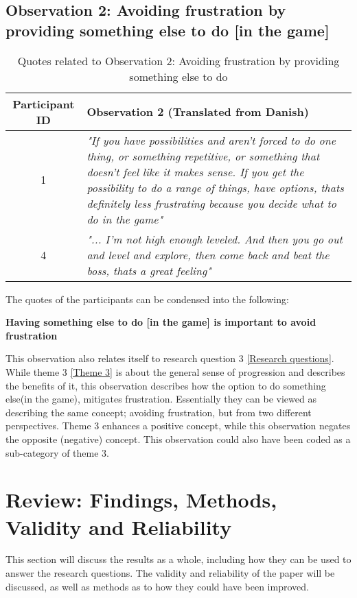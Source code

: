 \subsection{Observation 2: Avoiding frustration by providing something else to do [in the game]}\label{Observation 2}
\begin{table}[H]

\centering
\begin{tabular}{@{}c p{11cm}@{}}
\toprule
\textbf{Participant ID} & \textbf{Observation 2} (Translated from Danish)\\
\midrule

1 & \textit{"If you have possibilities and aren't forced to do one thing, or something repetitive, or something that doesn't feel like it makes sense. If you get the possibility to do a range of things, have options, thats definitely less frustrating because you decide what to do in the game"}\\

\midrule

4& \textit{"... I'm not high enough leveled. And then you go out and level and explore, then come back and beat the boss, thats a great feeling"}\\
\bottomrule
\end{tabular}

\caption{Quotes related to Observation 2: Avoiding frustration by providing something else to do}
\label{tab:obs2-quotes}
\end{table}

The quotes of the participants can be condensed into the following:
\begin{center}
    \textbf{Having something else to do [in the game] is important to avoid frustration}
\end{center}

This observation also relates itself to research question 3 \ref{Research questions}. While theme 3 \ref{Theme 3} is about the general sense of progression and describes the benefits of it, this observation describes how the option to do something else(in the game), mitigates frustration. Essentially they can be viewed as describing the same concept; avoiding frustration, but from two different perspectives. Theme 3 enhances a positive concept, while this observation negates the opposite (negative) concept. This observation could also have been coded as a sub-category of theme 3. 

\section{Review: Findings, Methods, Validity and Reliability}
This section will discuss the results as a whole, including how they can be used to answer the research questions. The validity and reliability of the paper will be discussed, as well as methods as to how they could have been improved. 


